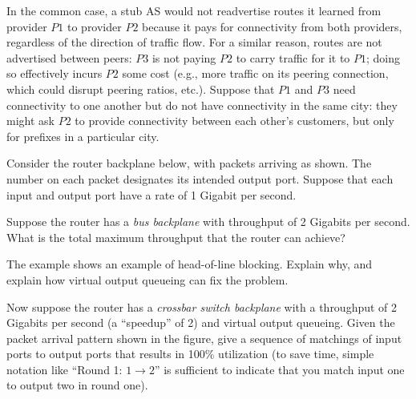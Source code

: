 \documentclass[11pt]{article}
\newcounter{partctr}
\newcommand{\ansbelow}{\probnote{Answer legibly in the space below.}}
\newcommand{\sols}[1]{#1}
\newcommand{\sols}[1]{}
\begin{document}
\sols{
\begin{answer}
In the common case, a stub AS would not readvertise routes it learned
from provider $P1$ to provider $P2$ because it pays for connectivity
from both providers, regardless of the direction of traffic flow.  For
a similar reason, routes are not advertised between peers: $P3$ is not
paying $P2$ to carry traffic for it to $P1$; doing so effectively incurs
$P2$ some cost (e.g., more traffic on its peering connection, which
could disrupt peering ratios, etc.).  Suppose that $P1$ and $P3$ need
connectivity to one another but do not have connectivity in the same
city: they might ask $P2$ to provide connectivity between each other's
customers, but only for prefixes in a particular city.
\end{answer}
}

\newpage
{} Consider the router backplane below, with packets arriving as
shown.  The number on each packet designates its intended output port.
Suppose that each input and output port have a rate of 1 Gigabit per
second. 
\begin{center}
\end{center}
\setcounter{partctr}{0}
\begin{list}{\bf{}.}{}
\item Suppose the router has a {\em bus backplane} with throughput of 2
  Gigabits per second.  What is the total maximum throughput that the
  router can achieve? 
\item The example shows an example of head-of-line blocking.  Explain
  why, and explain how virtual output queueing can fix the problem.
\item Now suppose the router has a {\em crossbar switch backplane} with
  a throughput of 2 Gigabits per second (a ``speedup'' of 2) and virtual
  output queueing.  Given the packet arrival pattern shown in the
  figure, give a sequence of matchings of input ports to output ports
  that results in 100\% utilization (to save time, simple notation like
  ``Round 1: $1\rightarrow 2$'' is sufficient to indicate that you match
  input one to output two in round one).
\end{list}
~\ansbelow
\eprob
\end{document}
